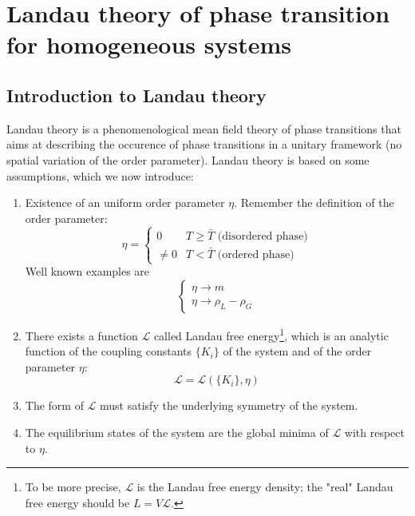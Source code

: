 \documentclass[../../Main/Main.tex]{subfiles}
\begin{document}
\chapter{Landau theory of phase transition for homogeneous systems}

\section{Introduction to Landau theory}

Landau theory is a phenomenological mean field theory of phase transitions  that aims at describing the occurence of phase transitions in a unitary framework (no spatial variation of the order parameter). Landau theory is based on some assumptions, which we now introduce:
\begin{enumerate}
\item Existence of an uniform order parameter \( \eta   \). Remember the definition of the order parameter:
\begin{equation*}
  \eta   = \begin{cases}
    0 & T \ge \bar{T} \text{ (disordered phase)}\\
    \neq 0 & T < \bar{T}  \text{ (ordered phase)}
\end{cases}
\end{equation*}
Well known examples are
\begin{equation*}
  \begin{cases}
   \eta \rightarrow m \\
  \eta  \rightarrow \rho _L - \rho _G
  \end{cases}
\end{equation*}

\item There exists a function \( \mathcal{L} \)  called Landau free energy\footnote{To be more precise,  \( \mathcal{L} \) is the Landau free energy density; the "real" Landau free energy should be  \( L = V \mathcal{L}  \).}, which is an analytic function of the coupling constants \( \{ K_i\} \) of the system and of the order parameter \( \eta  \):
\begin{equation*}
  \mathcal{L} = \mathcal{L} (\{K_i\},\eta )
\end{equation*}

\item The form of \( \mathcal{L} \) must satisfy the underlying symmetry of the system.
\item The equilibrium states of the system are the global minima of \( \mathcal{L} \) with respect to  \( \eta  \).

\end{enumerate}
\end{document}
